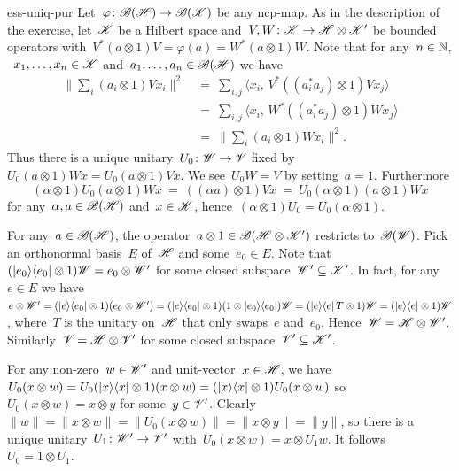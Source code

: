 \begin{solution}{ess-uniq-pur}%
Let~$\varphi\colon \mathscr{B}(\mathscr{H}) \to \mathscr{B}(\mathscr{K})$ be any ncp-map.
As in the description of the exercise,
    let~$\mathscr{K}$ be a Hilbert space
    and~$V,W\colon \mathscr{K} \to \mathscr{H} \otimes \mathscr{K}'$
    be bounded operators
    with~$V^* (a \otimes 1) V = \varphi(a) = W^* (a\otimes 1) W$.
Note that for any~$n\in \mathbb{N}$, ~$x_1,\ldots, x_n \in \mathscr{K}$
    and~$a_1, \ldots, a_n \in \mathscr{B}(\mathscr{H})$ we have
\begin{align*}
    \bigl\| \sum_i (a_i\otimes1) V x_i \bigr\|^2
    &\ = \ 
     \sum_{i,j} \langle x_i,\, V^* ((a_i^*a_j) \otimes 1) V x_j\rangle \\
    &\ = \ 
     \sum_{i,j} \langle x_i,\, W^* ((a_i^*a_j) \otimes 1) W x_j\rangle \\
     &\ = \ 
    \bigl\| \sum_i (a_i\otimes1) W x_i \bigr\|^2.
\end{align*}
Thus there is a unique unitary~$U_0\colon \mathscr{W} \to \mathscr{V}$
    fixed by~$U_0 (a \otimes 1) W x = U_0 (a \otimes 1) V x$.
We see~$U_0 W = V$ by setting~$a=1$.
Furthermore
    \begin{equation*}
        (\alpha \otimes 1) U_0 (a \otimes 1) W x
        \ = \ ((\alpha a)  \otimes 1) V x
        \ = \ U_0 (\alpha  \otimes 1 )(a  \otimes 1) W x
    \end{equation*}
    for any~$\alpha,a \in \mathscr{B}(\mathscr{H})$ and~$x \in \mathscr{K}$,
    hence~$(\alpha \otimes 1) U_0 = U_0 (\alpha \otimes 1)$.

For any~$a \in \mathscr{B}(\mathscr{H})$,
    the operator~$a \otimes 1 \in \mathscr{B}(\mathscr{H} \otimes \mathscr{K}')$
    restricts to~$\mathscr{B}(\mathscr{W})$.
Pick an orthonormal basis~$E$ of~$\mathscr{H}$
    and some~$e_0 \in E$.
    Note that~$(\left|e_0\right>\!\left<e_0\right| \otimes 1) \mathscr{W} = e_0 \otimes \mathscr{W}'$
    for some closed subspace~$\mathscr{W}' \subseteq \mathscr{K}'$.
In fact, for any~$e \in E$
    we have~$e \otimes \mathscr{W}'
    = (\left|e\right>\!\left<e_0\right| \otimes 1) (e_0 \otimes \mathscr{W}')
    = (\left|e\right>\!\left<e_0\right|\otimes 1)  (1 \otimes \left|e_0\right>\!\left<e_0\right|) \mathscr{W}
    = (\left|e\right>\!\left<e\right| T \otimes 1)  \mathscr{W} = (\left|e\right>\!\left<e\right| \otimes 1) \mathscr{W}$,
    where~$T$ is the unitary on~$\mathscr{H}$ that only swaps~$e$ and~$e_0$.
Hence~$\mathscr{W} = \mathscr{H} \otimes \mathscr{W}'$.
Similarly~$\mathscr{V} = \mathscr{H} \otimes \mathscr{V}'$
    for some closed subspace~$\mathscr{V}' \subseteq \mathscr{K}'$.

For any non-zero~$w \in \mathscr{W}'$ and unit-vector~$x \in \mathscr{H}$,
    we have~$U_0 (x \otimes w)
        = U_0 (\left|x\right>\!\left<x\right| \otimes 1)( x\otimes w)
        = (\left|x\right>\!\left<x\right| \otimes 1) U_0 (x\otimes w)$
        so~$U_0 (x \otimes w) = x \otimes y$ for some~$y \in \mathscr{V}'$.
Clearly~$\| w \| = \| x \otimes w\|=\| U_0 (x\otimes w) \|
        = \|x \otimes y\| = \|y\|$,
        so there is a unique unitary~$U_1\colon \mathscr{W}' \to \mathscr{V}'$
        with~$U_0 (x \otimes w) = x \otimes U_1 w$.
        It follows~$U_0 = 1 \otimes U_1$.


\end{solution}
